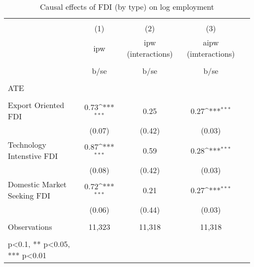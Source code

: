 \begin{table}
	\def\sym#1{\ifmmode^{#1}\else\(^{#1}\)\fi}
	\caption{Causal effects of FDI (by type) on log employment}
	\label{4_table1}
	\begin{tabular}{l*{1}{cccc}}
		\hline\hline
		&\multicolumn{4}{c}{}                                        \\
		& (1) & (2) & (3)    \\
		\
		&ipw & ipw (interactions) & aipw (imteractions)    \\
		\\
		&b/se&b/se& b/se       \\
		\hline
		\\
		ATE \\
		\\
		Export Oriented FDI &       0.73\sym{***} &  0.25  &   0.27\sym{***} \\
		&     (0.07)&     (0.42)&   (0.03)        \\
		Technology Intenstive FDI&       0.87\sym{***}&       0.59 &       0.28\sym{***}\\
		&     (0.08)&     (0.42)& (0.03)          \\
		Domestic Market Seeking FDI&       0.72\sym{***}&       0.21 &      0.27\sym{***}\\
		&     (0.06)&     (0.44)&     (0.03)   \\
		\hline
		\\
		Observations        &       11,323 &      11,318      &   11,318                  &            \\
		\hline\hline
		\\
		\small * p<0.1, ** p<0.05, *** p<0.01
	\end{tabular} \\
\end{table}

